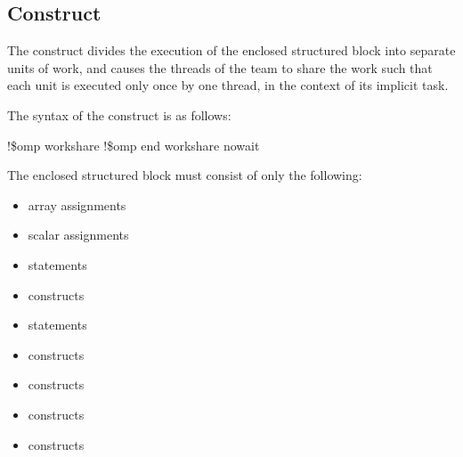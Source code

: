 \begin{samepage}
\vspace{3\baselineskip}
\fortranspecificstart
\vspace{-3\baselineskip}
\subsection{ Construct}
\label{subsec:workshare Construct}
\summary
The  construct divides the execution of the enclosed structured block into 
separate units of work, and causes the threads of the team to share the work such that 
each unit is executed only once by one thread, in the context of its implicit task.
\end{samepage}

\begin{samepage}
\syntax
The syntax of the  construct is as follows:

\begin{boxedcode}
!\$omp workshare
!\$omp end workshare \plc{[}nowait\plc{]}
\end{boxedcode}
\end{samepage}

The enclosed structured block must consist of only the following:

\begin{itemize}
\item array assignments 

\item scalar assignments 

\item {} statements

\item {} constructs 

\item {} statements

\item {} constructs

\item {} constructs

\item {} constructs

\item {} constructs
\end{itemize}

